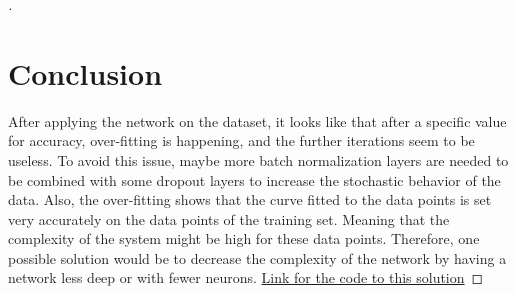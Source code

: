\documentclass[12pt,oneside,geqno]{article}
\begin{document}
\begin{proof}[\color{red}{Solution}]
		\section{Conclusion}
		After applying the network on the dataset, it looks like that after a specific value for accuracy, over-fitting is happening, and the further iterations seem to be useless. To avoid this issue, maybe more batch normalization layers are needed to be combined with some dropout layers to increase the stochastic behavior of the data. Also, the over-fitting shows that the curve fitted to the data points is set very accurately on the data points of the training set. Meaning that the complexity of the system might be high for these data points. Therefore, one possible solution would be to decrease the complexity of the network by having a network less deep or with fewer neurons.
		\href{https://colab.research.google.com/drive/1vs7KYJjMphoGcK-9g3tKnQ49ZFdIiYI5#scrollTo=ydX8Mu84z5oD}{Link for the code to this solution}
	\end{proof}
	
\end{document}
